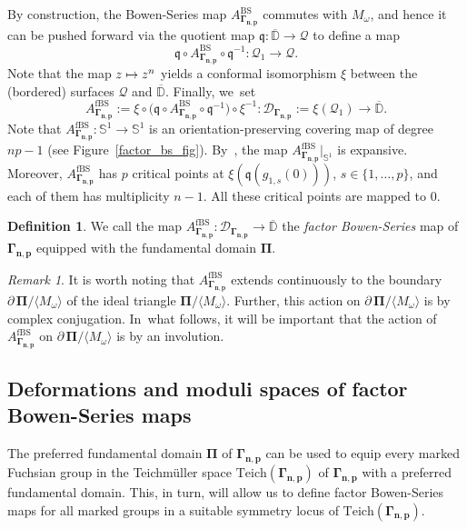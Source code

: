 \documentclass[JEP,XML,SOM,Unicode,NoFloatCountersInSection,published]{cedram}
\def\mto{\mathchoice{\longmapsto}{\mapsto}{\mapsto}{\mapsto}}
\theoremstyle{definition}
\newtheorem{definition}[lemma]{Definition}
\theoremstyle{remark}
\newtheorem{remark}[lemma]{Remark}
\newcommand{\D}{\mathbb{D}}
\begin{document}
By construction, the Bowen-Series map $A_{\pmb{\Gamma_{n,p}}}^{\mathrm{BS}}$ commutes with $M_\omega$, and hence it can be pushed forward via the quotient map $\mathfrak{q}:\overline{\D}\to\mathcal{Q}$ to define a map
\[
\mathfrak{q}\circ A_{\pmb{\Gamma_{n,p}}}^{\mathrm{BS}}\circ\mathfrak{q}^{-1}: \mathcal{Q}_1\to\mathcal{Q}.
\]
Note that the map $z\mto z^{n}$ yields a conformal isomorphism $\xi$ between the (bordered) surfaces $\mathcal{Q}$ and $\overline{\D}$. Finally, we~set
\[
A_{\pmb{\Gamma_{n,p}}}^{\mathrm{fBS}}:= \xi\circ \bigl(\mathfrak{q}\circ A_{\pmb{\Gamma_{n,p}}}^{\mathrm{BS}}\circ\mathfrak{q}^{-1}\bigr) \circ \xi^{-1}: \mathcal{D}_{\pmb{\Gamma_{n,p}}}:=\xi(\mathcal{Q}_1)\to \overline{\D}.
\]
Note that $A_{\pmb{\Gamma_{n,p}}}^{\mathrm{fBS}}:\mathbb{S}^1\to\mathbb{S}^1$ is an orientation-preserving covering map of degree $np-1$ (see Figure~\ref{factor_bs_fig}). By~\cite[Lem.\,3.7]{LMMN}, the map $A_{\pmb{\Gamma_{n,p}}}^{\mathrm{fBS}}\vert_{\mathbb{S}^1}$ is expansive. Moreover, $A_{\pmb{\Gamma_{n,p}}}^{\mathrm{fBS}}$ has $p$ critical points at $\xi(\mathfrak{q}(g_{1,s}(0)))$, $s\in\{1,\dots, p\}$, and each of them has multiplicity $n-1$. All these critical points are mapped to $0$.

\begin{definition}\label{factor_bs_base_def}
We call the map $A_{\pmb{\Gamma_{n,p}}}^{\mathrm{fBS}}: \mathcal{D}_{\pmb{\Gamma_{n,p}}}\to \overline{\D}$ the \emph{factor Bowen-Series} map of $\pmb{\Gamma_{n,p}}$ equipped with the fundamental domain $\pmb{\Pi}$.
\end{definition}

\begin{remark}\label{rmk-Pi}
It is worth noting that
$A_{\pmb{\Gamma_{n,p}}}^{\mathrm{fBS}}$ extends continuously to the boundary $\partial \, \pmb{\Pi}/\langle M_\omega\rangle$ of the ideal triangle $\pmb{\Pi}/\langle M_\omega\rangle$. Further, this action on $\partial \, \pmb{\Pi}/\langle M_\omega\rangle$ is by complex conjugation. In~what follows, it will be important that the action of $A_{\pmb{\Gamma_{n,p}}}^{\mathrm{fBS}}$ on $\partial \, \pmb{\Pi}/\langle M_\omega\rangle$ is by an involution.
\end{remark}

\subsection{Deformations and moduli spaces of factor Bowen-Series maps}\label{factor_bs_gen_subsec}

The preferred fundamental domain $\pmb{\Pi}$ of $\pmb{\Gamma_{n,p}}$ can be used to equip every marked Fuchsian group in the Teichmüller space $\mathrm{Teich}(\pmb{\Gamma_{n,p}})$ of $\pmb{\Gamma_{n,p}}$ with a preferred fundamental domain. This, in turn, will allow us to define factor Bowen-Series maps for all marked groups in a suitable symmetry locus of $\mathrm{Teich}(\pmb{\Gamma_{n,p}})$.
\end{document}
